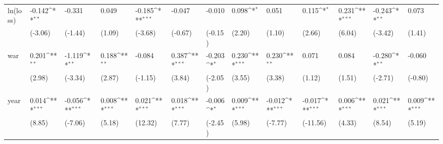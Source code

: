 \def\sym#1{\ifmmode^{#1}\else\(^{#1}\)\fi}
\begin{tabular}{p{1.5cm} p{1.7cm} p{1.7cm} p{1.7cm} p{1.7cm} p{1.7cm} p{1.7cm} p{1.7cm} p{1.7cm} p{1.7cm} p{1.7cm} p{1.7cm} p{1.7cm}}
\hline
ln(loss)        &   -0.142\sym{**} &   -0.331         &    0.049         &   -0.185\sym{***}&   -0.047         &   -0.010         &    0.098\sym{*}  &    0.051         &    0.115\sym{*}  &    0.231\sym{***}&   -0.243\sym{**} &    0.073         \\
                &  (-3.06)         &  (-1.44)         &   (1.09)         &  (-3.68)         &  (-0.67)         &  (-0.15)         &   (2.20)         &   (1.10)         &   (2.66)         &   (6.04)         &  (-3.42)         &   (1.41)         \\
war             &    0.201\sym{**} &   -1.119\sym{**} &    0.188\sym{**} &   -0.084         &    0.387\sym{***}&   -0.203\sym{*}  &    0.230\sym{***}&    0.230\sym{**} &    0.071         &    0.084         &   -0.280\sym{**} &   -0.060         \\
                &   (2.98)         &  (-3.34)         &   (2.87)         &  (-1.15)         &   (3.84)         &  (-2.05)         &   (3.55)         &   (3.38)         &   (1.12)         &   (1.51)         &  (-2.71)         &  (-0.80)         \\
year            &    0.014\sym{***}&   -0.056\sym{***}&    0.008\sym{***}&    0.021\sym{***}&    0.018\sym{***}&   -0.006\sym{*}  &    0.009\sym{***}&   -0.012\sym{***}&   -0.017\sym{***}&    0.006\sym{***}&    0.021\sym{***}&    0.009\sym{***}\\
                &   (8.85)         &  (-7.06)         &   (5.18)         &  (12.32)         &   (7.77)         &  (-2.45)         &   (5.98)         &  (-7.77)         & (-11.56)         &   (4.33)         &   (8.54)         &   (5.19)         \\
\end{tabular}
\def\sym#1{\ifmmode^{#1}\else\(^{#1}\)\fi}
